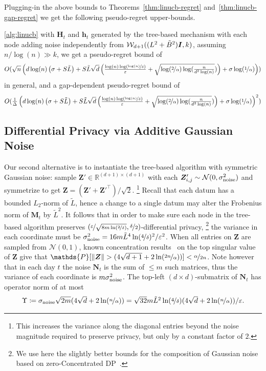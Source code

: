 \documentclass{article}
\makeatletter
\renewcommand{\vec}[1]{\bm{#1}}
\newcommand{\defeq}{\coloneq}
\newcommand{\Real}{\mathds{R}}
\newcommand{\iid}{\text{i.i.d.\@}}
\renewcommand{\Pr}{\mathds{P}}
\providecommand\transp{\top}
\let\transpsymbol\transp
\renewcommand{\transp}[1]{#1^\transpsymbol}
\newcommand{\Wishart}{\mathcal{W}}
\newcommand{\Normal}{\mathcal{N}}
\newcommand{\Eye}[1][]{\bm{I}\notblank{#1}{_{{#1}\times{#1}}}{}}
\makeatother
\begin{document}
Plugging-in the above bounds to Theorems~\ref{thm:linucb-regret} and~\ref{thm:linucb-gap-regret} we get the following pseudo-regret upper-bounds.
\begin{corollary}
\label{cor:regret_with_Wishart}
\cref{alg:linucb} with $\vec H_t$ and $\vec h_t$ generated by the tree-based
mechanism with each node adding noise independently from
$\Wishart_{d+1}( (L^2+\tilde B^2)\Eye, k )$, assuming
$n/\log(n)\gg k$, we get a pseudo-regret bound of
\[ O(\sqrt n\left( d\log(n)\left( \sigma+S\tilde{L} \right) +S\tilde{L}\sqrt d \left( \tfrac{\log(n)\log(\nicefrac{\log(n)}{\delta})}{\varepsilon} +\sqrt{\log(\nicefrac 2 \alpha)\log(\tfrac{n}{d^2\log(n)}}) \right) +\sigma\log(\nicefrac 1 \alpha) \right) )  \] in general, and a gap-dependent pseudo-regret bound of
\[ O(\tfrac1 \Delta\left( d\log(n)\left( \sigma+S\tilde{L} \right) +S\tilde{L}\sqrt d \left( \tfrac{\log(n)\log(\nicefrac{\log(n)}{\delta})}{\varepsilon} +\sqrt{\log(\nicefrac 2 \alpha)\log(\tfrac{n}{d^2\log(n)}}) \right) +\sigma\log(\nicefrac 1 \alpha) \right)^2 ) \]
\end{corollary}

\subsection{Differential Privacy via Additive Gaussian Noise}
\label{sec:dp-gauss}

Our second alternative is to instantiate the tree-based algorithm with
symmetric Gaussian noise: sample $\vec Z'\in\Real^{(d+1)\times(d+1)}$
with each $\vec Z_{i,j}' \sim \Normal(0,\sigma_{\rm noise}^2)$ \iid{}
and symmetrize to get $\vec Z = (\vec Z'+\transp{\vec Z'})/\sqrt 2$.%
\footnote{This increases the variance along the diagonal entries
  beyond the noise magnitude required to preserve privacy, but only by
  a constant factor of $2$.} %
Recall that each datum has a bounded $L_2$-norm of $\tilde L$, hence a
change to a single datum may alter the Frobenius norm of $\vec M_t$ by
$\tilde L^2$. It follows that in order to make sure each node in the
tree-based algorithm preserves
$(\nicefrac{\varepsilon}{\sqrt{8m\ln(\nicefrac{2}{\delta})}},
\nicefrac{\delta}{2})$-differential privacy,%
\footnote{We use here the slightly better bounds for the composition
  of Gaussian noise based on zero-Concentrated
  DP~\citep{BunConcentratedDifferentialPrivacy2016}.} %
the variance in each coordinate must be
$\sigma_{\rm noise}^2 = 16m\tilde L ^4 \ln(\nicefrac 4 \delta)^2 /
\varepsilon^2$.  When all entries on $\vec Z$ are sampled from
$\Normal(0,1)$, known concentration
results~\cite{TaoRandomMatrixTheory2012} on the top singular value of
$\vec Z$ give that
$\Pr[ \|\vec Z\| > (4\sqrt{d+1} + 2\ln(\nicefrac {2n} \alpha)) ] <
\nicefrac{\alpha}{2n}$. Note however that in each day $t$ the noise
$\vec N_t$ is the sum of $\leq m$ such matrices, thus the variance of
each coordinate is $m\sigma_{\rm noise}^2$.  The top-left
$(d\times d)$-submatrix of $\vec N_t$ has operator norm of at most
\begin{align*}\textstyle
\Upsilon \defeq \sigma_{\rm noise}\sqrt{2m}(4\sqrt{d} +
2\ln(\nicefrac n \alpha)) = \sqrt{32} m\tilde L ^2 \ln(\nicefrac 4
\delta)(4\sqrt{d} + 2\ln(\nicefrac n \alpha)) / \varepsilon.
\end{align*}
\end{document}
